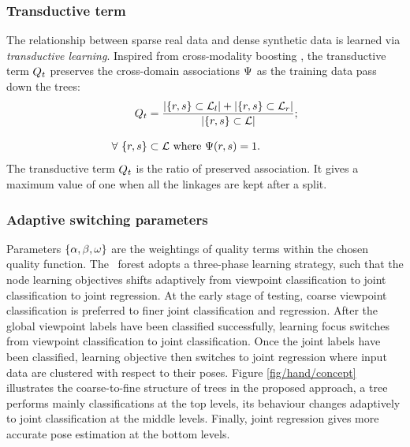 \subsubsection{Transductive term} 
The relationship between sparse real data and dense synthetic data is learned via \emph{transductive learning}. Inspired from cross-modality boosting \cite{Bronstein2010}, the transductive term $Q_{t}$ preserves the cross-domain associations $\mathrm{\Psi}$ as the training data pass down the trees: 
\begin{equation}
	\begin{split}
		Q_{t} &= 
		\frac{|\{r,s\} \subset \mathcal{L}_{l}| +  
		|\{r,s\} \subset \mathcal{L}_{r}|}{|\{r,s\} \subset \mathcal{L}|}; \\[3mm]   
		\forall\ \{r,s\} & \subset \mathcal{L} \mbox{ where } \mathrm{\Psi}(r,s) = 1.
	\end{split}
\end{equation}
The transductive term $Q_{t}$ is the ratio of preserved association. It gives a maximum value of one when all the linkages are kept after a split.   

\subsubsection{Adaptive switching parameters} 
Parameters $\{ \alpha, \beta, \omega \}$ are the weightings of quality terms within the chosen quality function.   
The \STR\ forest adopts a three-phase learning strategy, such that the node learning objectives shifts adaptively from viewpoint classification to joint classification to joint regression. 
At the early stage of testing, coarse viewpoint classification is preferred to finer joint classification and regression. 
After the global viewpoint labels have been classified successfully, learning focus switches from viewpoint classification to joint classification. 
Once the joint labels have been classified, learning objective then switches to joint regression where input data are clustered with respect to their poses.  
Figure \ref{fig/hand/concept} illustrates the coarse-to-fine structure of trees in the proposed approach, a tree performs mainly classifications at the top levels, its behaviour changes adaptively to joint classification at the middle levels. Finally, joint regression gives more accurate pose estimation at the bottom levels. 


